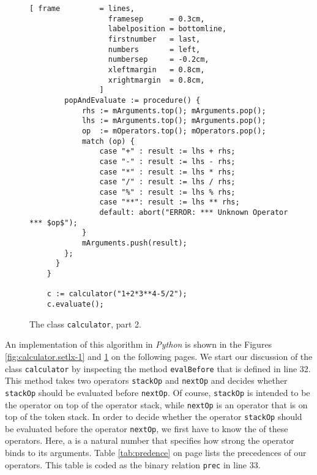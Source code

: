 \begin{figure}[!htb]
  \centering
\begin{Verbatim}[ frame         = lines, 
                  framesep      = 0.3cm, 
                  labelposition = bottomline,
                  firstnumber   = last,
                  numbers       = left,
                  numbersep     = -0.2cm,
                  xleftmargin   = 0.8cm,
                  xrightmargin  = 0.8cm,
                ]
        popAndEvaluate := procedure() {
            rhs := mArguments.top(); mArguments.pop();
            lhs := mArguments.top(); mArguments.pop();
            op  := mOperators.top(); mOperators.pop();
            match (op) {
                case "+" : result := lhs + rhs;
                case "-" : result := lhs - rhs;
                case "*" : result := lhs * rhs;
                case "/" : result := lhs / rhs;
                case "%" : result := lhs % rhs;
                case "**": result := lhs ** rhs;       
                default: abort("ERROR: *** Unknown Operator *** $op$");
            }
            mArguments.push(result);
        };    
      }
    }
    
    c := calculator("1+2*3**4-5/2");
    c.evaluate();
\end{Verbatim}
\vspace*{-0.3cm}
  \caption{The class \texttt{calculator}, part 2.}
  \label{fig:calculator.setlx-2}
\end{figure} 

\noindent
An implementation of this algorithm in \textsl{Python} is shown in the Figures
\ref{fig:calculator.setlx-1} and \ref{fig:calculator.setlx-2} on the following pages.
We start our discussion of the class \texttt{calculator} by inspecting the method
\texttt{evalBefore} that is defined in line 32.
This method takes two operators \texttt{stackOp} and \texttt{nextOp} and decides
whether \texttt{stackOp} should be evaluated before \texttt{nextOp}.  Of course, \texttt{stackOp} is
intended to be the operator on top of the operator stack, while \texttt{nextOp} is an operator that
is on top of the token stack.
In order to decide whether the operator \texttt{stackOp} should be evaluated before the operator
\texttt{nextOp},  we first have to know the  of these operators.  Here, a
 is a natural number that specifies how strong the operator binds to its
arguments. Table \ref{tab:predence} on page \pageref{tab:predence} lists the precedences of our
operators.  This table is coded as the binary relation \texttt{prec} in line 33.

